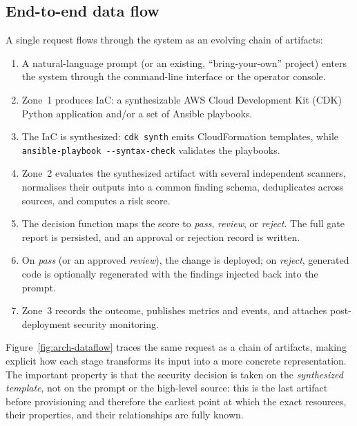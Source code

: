 \subsection{End-to-end data flow}
\label{subsec:arch-flow}

A single request flows through the system as an evolving chain of artifacts:

\begin{enumerate}
    \item A natural-language prompt (or an existing, ``bring-your-own'' project) enters
    the system through the command-line interface or the operator console.
    \item Zone~1 produces IaC: a synthesizable AWS Cloud Development Kit (CDK) Python
    application and/or a set of Ansible playbooks.
    \item The IaC is synthesized: \texttt{cdk synth} emits CloudFormation templates,
    while \texttt{ansible-playbook -{}-syntax-check} validates the playbooks.
    \item Zone~2 evaluates the synthesized artifact with several independent scanners,
    normalises their outputs into a common finding schema, deduplicates across sources,
    and computes a risk score.
    \item The decision function maps the score to \emph{pass}, \emph{review}, or
    \emph{reject}. The full gate report is persisted, and an approval or rejection
    record is written.
    \item On \emph{pass} (or an approved \emph{review}), the change is deployed; on
    \emph{reject}, generated code is optionally regenerated with the findings injected
    back into the prompt.
    \item Zone~3 records the outcome, publishes metrics and events, and attaches
    post-deployment security monitoring.
\end{enumerate}

Figure~\ref{fig:arch-dataflow} traces the same request as a chain of artifacts, making
explicit how each stage transforms its input into a more concrete representation. The
important property is that the security decision is taken on the \emph{synthesized
template}, not on the prompt or the high-level source: this is the last artifact before
provisioning and therefore the earliest point at which the exact resources, their
properties, and their relationships are fully known.

